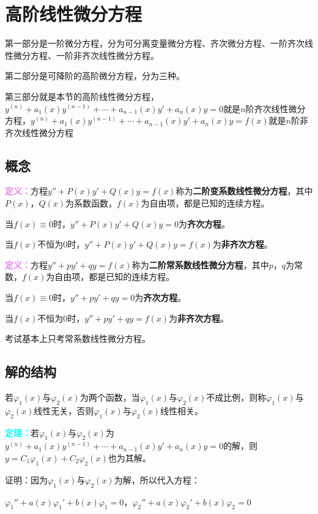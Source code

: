 \documentclass[UTF8, 12pt]{ctexart}
\begin{document}
\section{高阶线性微分方程}

第一部分是一阶微分方程，分为可分离变量微分方程、齐次微分方程、一阶齐次线性微分方程、一阶非齐次线性微分方程。

第二部分是可降阶的高阶微分方程，分为三种。

第三部分就是本节的高阶线性微分方程，$y^{(n)}+a_1(x)y^{(n-1)}+\cdots+a_{n-1}(x)y'+a_n(x)y=0$就是$n$阶齐次线性微分方程，$y^{(n)}+a_1(x)y^{(n-1)}+\cdots+a_{n-1}(x)y'+a_n(x)y=f(x)$就是$n$阶非齐次线性微分方程

\subsection{概念}

\textcolor{violet}{\textbf{定义：}}方程$y''+P(x)y'+Q(x)y=f(x)$称为\textbf{二阶变系数线性微分方程}，其中$P(x)$，$Q(x)$为系数函数，$f(x)$为自由项，都是已知的连续方程。

当$f(x)\equiv0$时，$y''+P(x)y'+Q(x)y=0$为\textbf{齐次方程}。

当$f(x)$不恒为0时，$y''+P(x)y'+Q(x)y=f(x)$为\textbf{非齐次方程}。

\textcolor{violet}{\textbf{定义：}}方程$y''+py'+qy=f(x)$称为\textbf{二阶常系数线性微分方程}，其中$p$，$q$为常数，$f(x)$为自由项，都是已知的连续方程。

当$f(x)\equiv0$时，$y''+py'+qy=0$为\textbf{齐次方程}。

当$f(x)$不恒为0时，$y''+py'+qy=f(x)$为\textbf{非齐次方程}。

考试基本上只考常系数线性微分方程。

\subsection{解的结构}

若$\varphi_1(x)$与$\varphi_2(x)$为两个函数，当$\varphi_1(x)$与$\varphi_2(x)$不成比例，则称$\varphi_1(x)$与$\varphi_2(x)$线性无关，否则$\varphi_1(x)$与$\varphi_2(x)$线性相关。

\textcolor{aqua}{\textbf{定理：}}若$\varphi_1(x)$与$\varphi_2(x)$为$y^{(n)}+a_1(x)y^{(n-1)}+\cdots+a_{n-1}(x)y'+a_n(x)y=0$的解，则$y=C_1\varphi_1(x)+C_2\varphi_2(x)$也为其解。

证明：因为$\varphi_1(x)$与$\varphi_2(x)$为解，所以代入方程：

$\varphi_1''+a(x)\varphi_1'+b(x)\varphi_1=0$，$\varphi_2''+a(x)\varphi_2'+b(x)\varphi_2=0$
\end{document}
